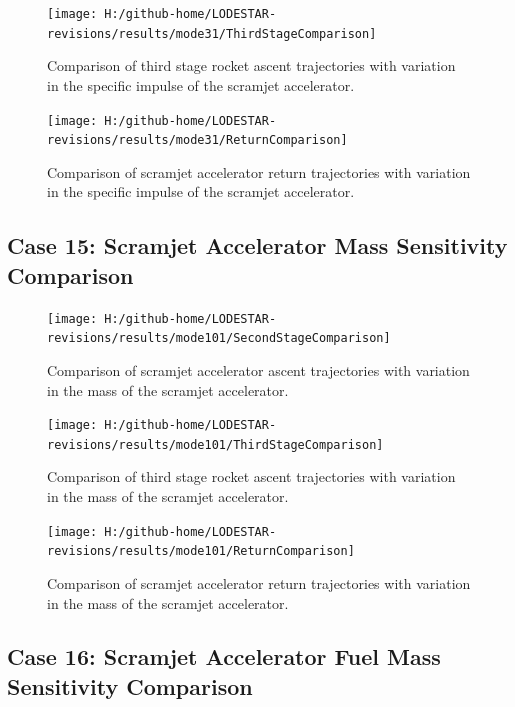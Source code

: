 \begin{figure}[!th]
	\centering
	\texttt{[image: H:/github-home/LODESTAR-revisions/results/mode31/ThirdStageComparison]}
	\caption{Comparison of third stage rocket ascent trajectories with variation in the specific impulse of the scramjet accelerator.}
	\label{fig:ThirdStageComparison10}
\end{figure}

\begin{figure}[!th]
	\centering
	\texttt{[image: H:/github-home/LODESTAR-revisions/results/mode31/ReturnComparison]}
	\caption{Comparison of scramjet accelerator return trajectories with variation in the specific impulse of the scramjet accelerator.}
	\label{fig:ReturnComparison10}
\end{figure}
\FloatBarrier
\clearpage
\subsection{Case 15: Scramjet Accelerator Mass Sensitivity Comparison}\label{sec:app_comparison101}

\begin{figure}[!th]
\centering
\texttt{[image: H:/github-home/LODESTAR-revisions/results/mode101/SecondStageComparison]}
\caption{Comparison of scramjet accelerator ascent trajectories with variation in the mass of the scramjet accelerator.}
\label{fig:SecondStageComparison12}
\end{figure}

\begin{figure}[!th]
\centering
\texttt{[image: H:/github-home/LODESTAR-revisions/results/mode101/ThirdStageComparison]}
\caption{Comparison of third stage rocket ascent trajectories with variation in the mass of the scramjet accelerator.}
\label{fig:ThirdStageComparison12}
\end{figure}

\begin{figure}[!th]
\centering
\texttt{[image: H:/github-home/LODESTAR-revisions/results/mode101/ReturnComparison]}
\caption{Comparison of scramjet accelerator return trajectories with variation in the mass of the scramjet accelerator.}
\label{fig:ReturnComparison12}
\end{figure}

\FloatBarrier
\clearpage
\subsection{Case 16: Scramjet Accelerator Fuel Mass Sensitivity Comparison}\label{sec:app_comparison111}

